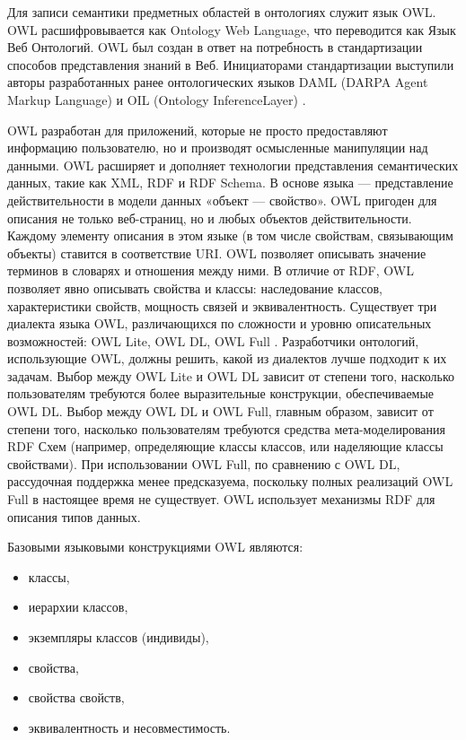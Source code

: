 Для записи семантики предметных областей в онтологиях служит язык OWL. OWL расшифровывается как Ontology Web Language, что переводится как Язык Веб Онтологий. OWL был создан в ответ на потребность в стандартизации способов представления знаний в Веб. Инициаторами стандартизации выступили авторы разработанных ранее онтологических языков DAML (DARPA Agent Markup Language) и OIL (Ontology InferenceLayer)  \cite{trofim2011evo}. 

OWL разработан для приложений, которые не просто предоставляют информацию пользователю, но и производят осмысленные манипуляции над данными. OWL расширяет и дополняет технологии представления семантических данных, такие как XML, RDF и RDF Schema. В основе языка — представление действительности в модели данных «объект — свойство». OWL пригоден для описания не только веб-страниц, но и любых объектов действительности. Каждому элементу описания в этом языке (в том числе свойствам, связывающим объекты) ставится в соответствие URI. OWL позволяет описывать значение терминов в словарях и отношения между ними. В отличие от RDF, OWL позволяет явно описывать свойства и классы: наследование классов, характеристики свойств, мощность связей и эквивалентность. Существует три диалекта языка OWL, различающихся по сложности и уровню описательных возможностей: OWL Lite, OWL DL, OWL Full \cite{mcguinness2004owl}. Разработчики онтологий, использующие OWL, должны решить, какой из диалектов лучше подходит к их задачам. Выбор между OWL Lite и OWL DL зависит от степени того, насколько пользователям требуются более выразительные конструкции, обеспечиваемые OWL DL. Выбор между OWL DL и OWL Full, главным образом, зависит от степени того, насколько пользователям требуются средства мета-моделирования RDF Схем (например, определяющие классы классов, или наделяющие классы свойствами). При использовании OWL Full, по сравнению с OWL DL, рассудочная поддержка менее предсказуема, поскольку полных реализаций OWL Full в настоящее время не существует. OWL использует механизмы RDF для описания типов данных. 

Базовыми языковыми конструкциями OWL являются:

\begin{itemize}
\item классы, 
\item иерархии классов,
\item экземпляры классов (индивиды),
\item свойства,
\item свойства свойств,
\item эквивалентность и несовместимость.
\end{itemize}

